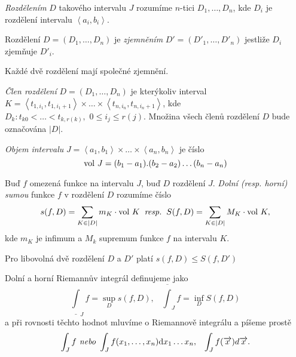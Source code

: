 \begin{definice}
\begin{pitemize}
\item \emph{Rozdělením} $D$ takového intervalu $J$ rozumíme $n$-tici $D_1, \dots, D_n$, kde $D_i$ je rozdělení intervalu $\left<a_i,b_i\right>$.
\item Rozdělení $D=(D_1,\dots,D_n)$ je \emph{zjemněním} $D'=(D'_1,\dots,D'_n)$ jestliže $D_i$ zjemňuje $D'_i$.
\end{pitemize}
\end{definice}

\begin{pozorovani}
Každé dvě rozdělení mají společné zjemnění.
\end{pozorovani}

\begin{definice}
\emph{Člen rozdělení} $D=(D_1,\dots,D_n)$ je kterýkoliv interval $K=\left<t_{1, i_1}, t_{1, i_1+1}\right> \times \dots \times \left<t_{n, i_n}, t_{n, i_n+1}\right>$, kde $D_k: t_{k0} < \dots < t_{k,r(k)}, \, \, 0 \le i_j \le r(j)$. Množina všech členů rozdělení $D$ bude označována $|D|$. %
\end{definice}

\begin{definice}
\emph{Objem intervalu} $J=\left<a_1,b_1\right> \times \dots \times \left<a_n,b_n\right>$ je číslo
$$\mathrm{vol\ } J=(b_1-a_1).(b_2-a_2)\dots(b_n-a_n)$$
\end{definice}

\begin{definice}
Buď $f$ omezená funkce na intervalu $J$, buď $D$ rozdělení $J$. \emph{Dolní (resp. horní) sumou} funkce $f$ v rozdělení $D$ rozumíme číslo
$$s(f,D)=\sum_{K\in |D|}m_K\cdot\mathrm{vol\ } K \textit{\;\;resp.\;\;} S(f,D) = \sum_{K \in |D|} M_K\cdot\mathrm{vol\ } K,$$
kde $m_K$ je infimum a $M_k$ supremum funkce $f$ na intervalu $K$.
\end{definice}

\begin{pozorovani}
Pro libovolná dvě rozdělení $D$ a $D'$ platí $s(f,D) \le S(f,D')$
\end{pozorovani}

\begin{definice}
Dolní a horní Riemannův integrál definujeme jako
$$\underline{\int}_Jf=\sup_Ds(f,D), \;\;\; \overline{\int}_Jf=\inf_DS(f,D)$$
a při rovnosti těchto hodnot mluvíme o Riemannově integrálu a píšeme prostě
$$\int_Jf \textit{ nebo } \int_Jf(x_1,\dots,x_n)\mathrm{d} x_1\dots x_n, \;\;\;\int_Jf(\overrightarrow{x})d\overrightarrow{x}.$$
\end{definice}

